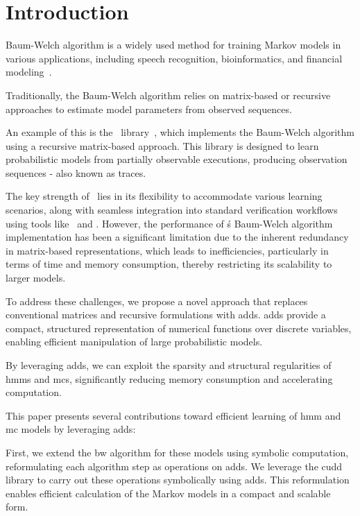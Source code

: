 
\section{Introduction}\label{sec:introduction}
 Baum-Welch algorithm is a widely used method for training Markov models in various applications, including speech recognition, bioinformatics, and financial modeling~\cite{chavan2013overview,ciocchetta2009bio,mamon2007hidden}.

Traditionally, the Baum-Welch algorithm relies on matrix-based or recursive approaches to estimate model parameters from observed sequences.

An example of this is the \Jajapy\ library~\cite{ReynouardIB23}, which implements the Baum-Welch algorithm using a recursive matrix-based approach.
This library is designed to learn probabilistic models from partially observable executions, producing observation sequences - also known as traces.

The key strength of \Jajapy\ lies in its flexibility to accommodate various learning scenarios, along with seamless integration into standard verification workflows using tools like \Storm\ and \Prism.
However, the performance of \Jajapy\'s Baum-Welch algorithm implementation has been a significant limitation due to the inherent redundancy in matrix-based representations, which leads to inefficiencies, particularly in terms of time and memory consumption, thereby restricting its scalability to larger models.

To address these challenges, we propose a novel approach that replaces conventional matrices and recursive formulations with \glspl{add}.
\glspl{add} provide a compact, structured representation of numerical functions over discrete variables, enabling efficient manipulation of large probabilistic models.

By leveraging \glspl{add}, we can exploit the sparsity and structural regularities of \glspl{hmm} and \glspl{mc}, significantly reducing memory consumption and accelerating computation.

This paper presents several contributions toward efficient learning of \gls{hmm} and \gls{mc} models by leveraging \glspl{add}:

First, we extend the \gls{bw} algorithm for these models using symbolic computation, reformulating each algorithm step as operations on \glspl{add}.
We leverage the \gls{cudd} library to carry out these operations symbolically using \glspl{add}.
This reformulation enables efficient calculation of the Markov models in a compact and scalable form.

